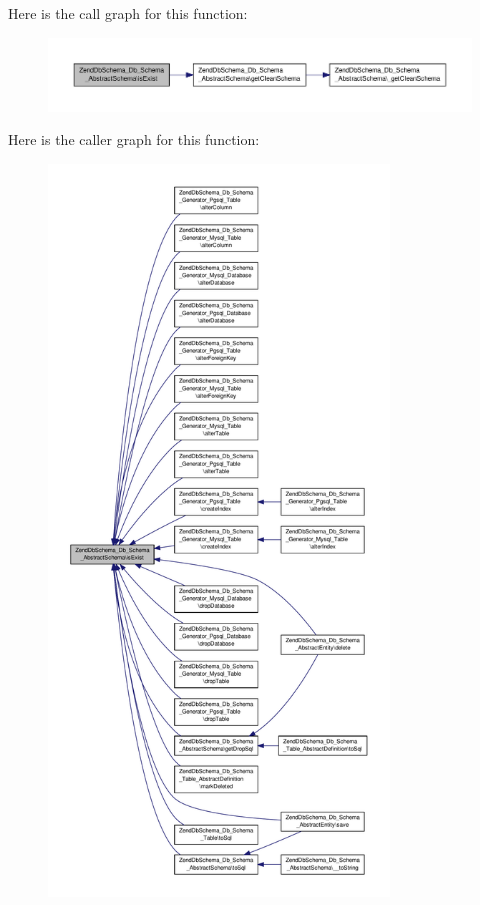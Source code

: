 Here is the call graph for this function\-:\nopagebreak
\begin{figure}[H]
\begin{center}
\leavevmode
\includegraphics[width=350pt]{classZendDbSchema__Db__Schema__AbstractSchema_a1680a8fd22360f74d29b641d7257a52f_cgraph}
\end{center}
\end{figure}




Here is the caller graph for this function\-:\nopagebreak
\begin{figure}[H]
\begin{center}
\leavevmode
\includegraphics[height=550pt]{classZendDbSchema__Db__Schema__AbstractSchema_a1680a8fd22360f74d29b641d7257a52f_icgraph}
\end{center}
\end{figure}


